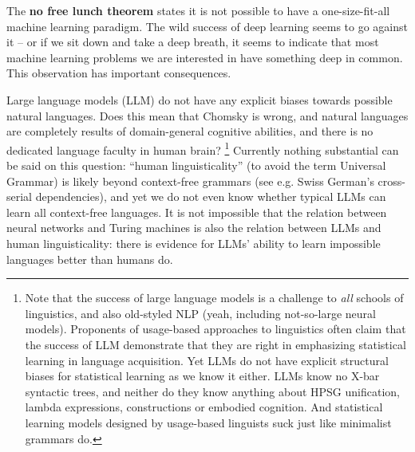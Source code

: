 \documentclass[hyperref, a4paper, 12pt]{report}
\newcommand*{\concept}[1]{{\textbf{#1}}}
\begin{document}
The \concept{no free lunch theorem} states it is not possible to have a one-size-fit-all machine learning paradigm.
The wild success of deep learning seems to go against it -- or if we sit down and take a deep breath, it seems to indicate that most machine learning problems we are interested in have something deep in common.
This observation has important consequences.

Large language models (LLM) do not have any explicit biases towards possible natural languages.
Does this mean that Chomsky is wrong,
and natural languages are completely results of domain-general cognitive abilities,
and there is no dedicated language faculty in human brain?%
\footnote{
    Note that the success of large language models is a challenge to \emph{all} schools of linguistics,
    and also old-styled NLP (yeah, including not-so-large neural models).
    Proponents of usage-based approaches to linguistics often claim that the success of LLM 
    demonstrate that they are right in emphasizing statistical learning in language acquisition.
    Yet LLMs do not have explicit structural biases for statistical learning as we know it either.
    LLMs know no X-bar syntactic trees, and neither do they know anything about HPSG unification, lambda expressions, constructions or embodied cognition.
    And statistical learning models designed by usage-based linguists suck
    just like minimalist grammars do.
}
Currently nothing substantial can be said on this question:
``human linguisticality'' (to avoid the term Universal Grammar) is likely beyond context-free grammars (see e.g. Swiss German's cross-serial dependencies),
and yet we do not even know whether typical LLMs can learn all context-free languages.
It is not impossible that the relation between neural networks and Turing machines
is also the relation between LLMs and human linguisticality:
there is evidence for LLMs' ability to learn impossible languages better than humans do.%
\end{document}
